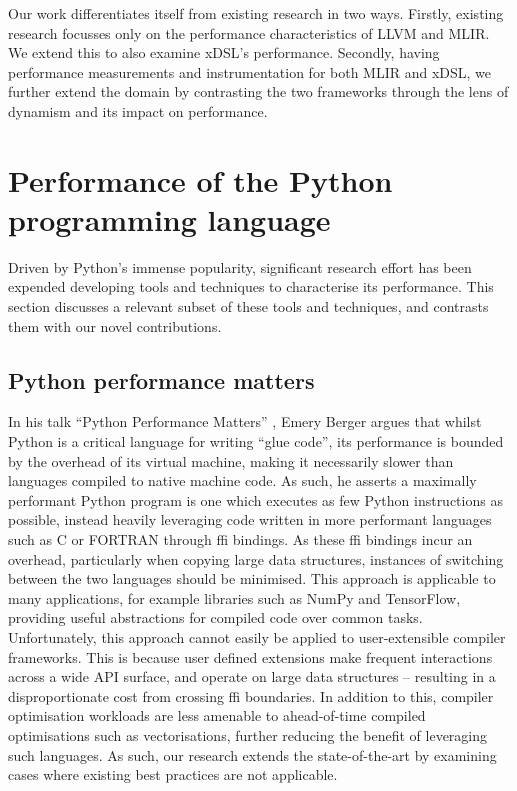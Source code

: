 Our work differentiates itself from existing research in two ways.
Firstly, existing research focusses only on the performance characteristics of LLVM and MLIR. We extend this to also examine xDSL's performance.
Secondly, having performance measurements and instrumentation for both MLIR and xDSL, we further extend the domain by contrasting the two frameworks through the lens of dynamism and its impact on performance.






\section{Performance of the Python programming language}
\label{sec:python-performance}

Driven by Python's immense popularity, significant research effort has been expended developing tools and techniques to characterise its performance.
This section discusses a relevant subset of these tools and techniques, and contrasts them with our novel contributions.

\subsection{Python performance matters}
\label{ssec:python-performance-matters}

In his talk ``Python Performance Matters'' \cite{emerybergerPythonPerformanceMatters2022}, Emery Berger argues that whilst Python is a critical language for writing ``glue code'', its performance is bounded by the overhead of its virtual machine, making it necessarily slower than languages compiled to native machine code.
As such, he asserts a maximally performant Python program is one which executes as few Python instructions as possible, instead heavily leveraging code written in more performant languages such as C or FORTRAN through \ac{ffi} bindings.
As these \ac{ffi} bindings incur an overhead, particularly when copying large data structures, instances of switching between the two languages should be minimised.
This approach is applicable to many applications, for example libraries such as NumPy and TensorFlow, providing useful abstractions for compiled code over common tasks.
Unfortunately, this approach cannot easily be applied to user-extensible compiler frameworks. This is because user defined extensions make frequent interactions across a wide API surface, and operate on large data structures -- resulting in a disproportionate cost from crossing \ac{ffi} boundaries.
In addition to this, compiler optimisation workloads are less amenable to ahead-of-time compiled optimisations such as vectorisations, further reducing the benefit of leveraging such languages.
As such, our research extends the state-of-the-art by examining cases where existing best practices are not applicable.


